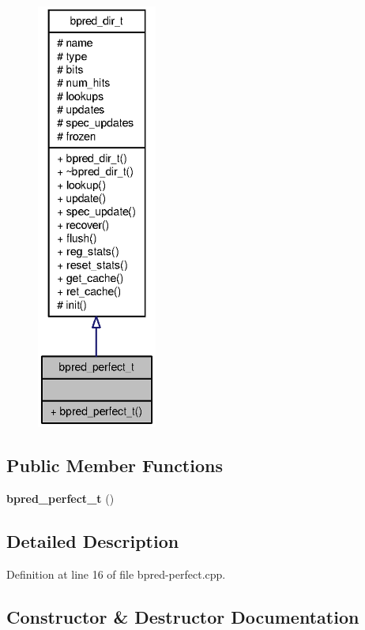 \begin{figure}[H]
\begin{center}
\leavevmode
\includegraphics[height=400pt]{classbpred__perfect__t__coll__graph}
\end{center}
\end{figure}
\subsection*{Public Member Functions}
\begin{CompactItemize}
\item 
{\bf bpred\_\-perfect\_\-t} ()
\end{CompactItemize}


\subsection{Detailed Description}


Definition at line 16 of file bpred-perfect.cpp.

\subsection{Constructor \& Destructor Documentation}
